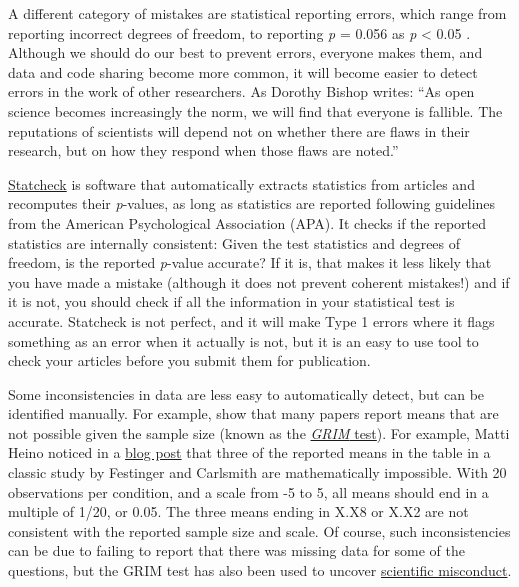\documentclass[
  oneside]{krantz}
\begin{document}
A different category of mistakes are statistical reporting errors, which range from reporting incorrect degrees of freedom, to reporting \emph{p} = 0.056 as \emph{p} \textless{} 0.05 \citep{nuijten_prevalence_2015}. Although we should do our best to prevent errors, everyone makes them, and data and code sharing become more common, it will become easier to detect errors in the work of other researchers. As Dorothy Bishop \citeyearpar{bishop_fallibility_2018} writes: ``As open science becomes increasingly the norm, we will find that everyone is fallible. The reputations of scientists will depend not on whether there are flaws in their research, but on how they respond when those flaws are noted.''

\href{http://statcheck.io/}{Statcheck} is software that automatically extracts statistics from articles and recomputes their \emph{p}-values, as long as statistics are reported following guidelines from the American Psychological Association (APA). It checks if the reported statistics are internally consistent: Given the test statistics and degrees of freedom, is the reported \emph{p}-value accurate? If it is, that makes it less likely that you have made a mistake (although it does not prevent coherent mistakes!) and if it is not, you should check if all the information in your statistical test is accurate. Statcheck is not perfect, and it will make Type 1 errors where it flags something as an error when it actually is not, but it is an easy to use tool to check your articles before you submit them for publication.

Some inconsistencies in data are less easy to automatically detect, but can be identified manually. For example, \citet{brown_grim_2017} show that many papers report means that are not possible given the sample size (known as the \href{http://nickbrown.fr/GRIM}{\emph{GRIM} test}). For example, Matti Heino noticed in a \href{https://mattiheino.com/2016/11/13/legacy-of-psychology/}{blog post} that three of the reported means in the table in a classic study by Festinger and Carlsmith are mathematically impossible. With 20 observations per condition, and a scale from -5 to 5, all means should end in a multiple of 1/20, or 0.05. The three means ending in X.X8 or X.X2 are not consistent with the reported sample size and scale. Of course, such inconsistencies can be due to failing to report that there was missing data for some of the questions, but the GRIM test has also been used to uncover \href{https://en.wikipedia.org/wiki/GRIM_test}{scientific misconduct}.
\end{document}
